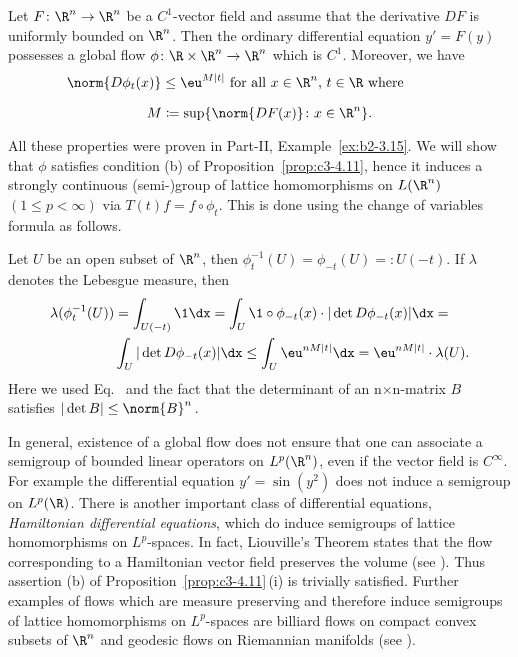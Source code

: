 \begin{example}\label{ex:c3-4.12}
Let $F \colon \R ^n \to \R ^n$ be a $C^1$-vector field and assume that
the derivative $DF$ is uniformly bounded on $\R ^n$. Then the ordinary
differential equation $y' = F(y)$ possesses a global flow
$\phi \colon \R  \times \R ^n \to \R ^n$ which is $C^1$. Moreover, we have
\begin{equation}\label{eq:c3-4.13}
\begin{minipage}{.8\textwidth} 
$\norm{D\phi_t(x)} \leq \eu^{M|t|}$  for all  $x \in \R ^n$, $t \in \R$  where   
%
\[
	M \coloneqq  \sup \{\norm{DF(x)} \colon x \in \R ^n\}.
\]
% 
\end{minipage}
\end{equation}

All these properties were proven in Part-II, Example~\ref{ex:b2-3.15}.
We will show that $\phi$ satisfies condition (b) of Proposition~\ref{prop:c3-4.11},
hence it induces a strongly continuous (semi-)group of lattice homomorphisms
on $L(\R ^n)$ $(1 \leq p < \infty)$ via $T(t)f = f \circ \phi_t$.
This is done using the change of variables formula as follows.

Let $U$ be an open subset of\/ $\R ^n$, then $\phi_t^{-1}(U) = \phi_{-t}(U) =\colon U(-t)$. 
If\/ $\lambda$ denotes the Lebesgue measure, then
\begin{equation}\label{eq:c3-4.14}
	\begin{split}
		\lambda(\phi_t^{-1}(U)) &= \int_{U(-t)} \1 \dx  = \int_{U} \1 \circ \phi_{-t}(x) \cdot |\det D\phi_{-t}(x)| \dx  = \\
		&\int_{U} |\det D\phi_{-t}(x)| \dx  \leq \int_{U} \eu^{nM|t|} \dx  = \eu^{nM|t|} \cdot \lambda(U).
	\end{split}
\end{equation}
Here we used Eq.~ and the fact that the determinant of an n$\times$n-matrix
$B$ satisfies $|\det B| \leq \norm{B}^n$\,.
\end{example}

In general, existence of a global flow does not ensure that one can
associate a semigroup of bounded linear operators on $L^p(\R ^n)$, even if
the vector field is $C^{\infty}$. For example the differential equation
$y' = \sin(y^2)$ does not induce a semigroup on $L^p(\R )$.
There is another important class of differential equations, \emph{Hamiltonian differential equations}, which do induce semigroups of lattice homomorphisms on $L^p$-spaces. In fact, Liouville's Theorem states that the flow corresponding to a Hamiltonian vector field preserves the volume (see \textcite[Section~3.3]{abraham:1978}). Thus assertion (b) of Proposition~\ref{prop:c3-4.11}\,(i) is trivially satisfied.
Further examples of flows which are measure preserving and therefore induce semigroups of lattice homomorphisms on $L^p$-spaces are billiard flows on compact convex subsets of\/ $\R ^n$ and geodesic flows on Riemannian manifolds (see \textcite{cornfeldetal:1982}).
